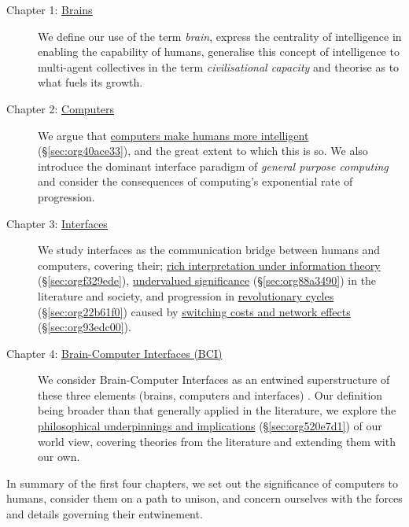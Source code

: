 \documentclass[logo,bsc,singlespacing,parskip]{infthesis}
\begin{document}
\begin{description}
\item[{Chapter 1: \hyperref[sec:orgb747b4e]{Brains}}] We define our use of the term \emph{brain}, express the centrality of intelligence in enabling the capability of humans, generalise this concept of intelligence to multi-agent collectives in the term \emph{civilisational capacity} and theorise as to what fuels its growth.

\item[{Chapter 2: \hyperref[sec:orge8dbfb3]{Computers}}] We argue that \hyperref[sec:org40ace33]{computers make humans more intelligent} (\S \ref{sec:org40ace33}), and the great extent to which this is so.
We also introduce the dominant interface paradigm of \emph{general purpose computing} and consider the consequences of computing's exponential rate of progression.

\item[{Chapter 3: \hyperref[sec:orgd446ca7]{Interfaces}}] We study interfaces as the communication bridge between humans and computers, covering their;  \hyperref[sec:orgf329ede]{rich interpretation under information theory} (\S \ref{sec:orgf329ede}), \hyperref[sec:org88a3490]{undervalued significance} (\S \ref{sec:org88a3490}) in the literature and society, and progression in \hyperref[sec:org22b61f0]{revolutionary cycles} (\S \ref{sec:org22b61f0}) caused by \hyperref[sec:org93edc00]{switching costs and network effects} (\S \ref{sec:org93edc00}).

\item[{Chapter 4: \hyperref[sec:orge068703]{Brain-Computer Interfaces (BCI)}}] We consider Brain-Computer Interfaces as an entwined superstructure of these three elements (brains, computers and interfaces) . Our definition being broader than that generally applied in the literature, we explore the \hyperref[sec:org520e7d1]{philosophical underpinnings and implications} (\S \ref{sec:org520e7d1}) of our world view, covering theories from the literature and extending them with our own.
\end{description}

In summary of the first four chapters, we set out the significance of computers to humans, consider them on a path to unison, and concern ourselves with the forces and details governing their entwinement.
\end{document}
